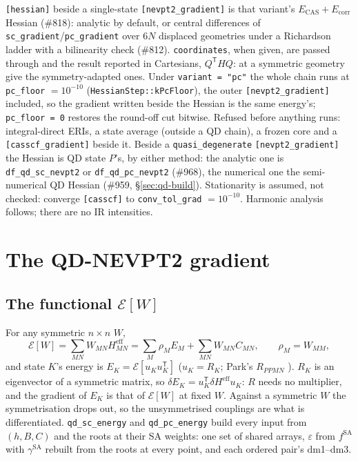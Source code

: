 \documentclass[11pt]{article}
\newcommand{\code}[1]{\texttt{#1}}
\newcommand{\eps}{\varepsilon}
\newcommand{\Ecas}{E_{\mathrm{CAS}}}
\newcommand{\Ecorr}{E_{\mathrm{corr}}}
\newcommand{\Heff}{H^{\mathrm{eff}}}
\newcommand{\T}{\mathsf T}
\begin{document}
\code{[hessian]} beside a single-state \code{[nevpt2\_gradient]} is that
variant's $\Ecas + \Ecorr$ Hessian (\#818): analytic by default, or
central differences of \code{sc\_gradient}/\code{pc\_gradient} over $6N$
displaced geometries under a Richardson ladder with a bilinearity check
(\#812). \code{coordinates}, when given, are passed through and the result
reported in Cartesians, $Q^\T HQ$: at a symmetric geometry give the
symmetry-adapted ones. Under \code{variant = "pc"} the whole chain runs at
\code{pc\_floor} $= 10^{-10}$ (\code{HessianStep::kPcFloor}), the outer
\code{[nevpt2\_gradient]} included, so the gradient written beside the
Hessian is the same energy's; \code{pc\_floor = 0} restores the round-off
cut bitwise. Refused before anything runs: integral-direct ERIs, a state
average (outside a QD chain), a frozen core and a
\code{[casscf\_gradient]} beside it. Beside a \code{quasi\_degenerate}
\code{[nevpt2\_gradient]} the Hessian is QD state $P$'s, by either
method: the analytic one is \code{df\_qd\_sc\_nevpt2} or
\code{df\_qd\_pc\_nevpt2} (\#968), the numerical one the semi-numerical QD
Hessian (\#959, \S\ref{sec:qd-build}). Stationarity is assumed, not checked:
converge \code{[casscf]} to \code{conv\_tol\_grad} $= 10^{-10}$. Harmonic
analysis follows; there are no IR intensities.

\section{The QD-NEVPT2 gradient}
\label{sec:qdgrad}

\subsection{The functional $\mathcal E[W]$}

For any symmetric $n\times n$ $W$,
\begin{equation}
  \mathcal E[W] = \sum_{MN}W_{MN}\Heff_{MN} = \sum_M\rho_M E_M + \sum_{MN}W_{MN}C_{MN},\qquad
  \rho_M = W_{MM},
  \label{eq:EW}
\end{equation}
and state $K$'s energy is $E_K = \mathcal E[u_Ku_K^\T]$ ($u_K = R_K$; Park's
$R_{PPMN}$ \cite{park2020}). $R_K$ is an eigenvector of a symmetric matrix,
so $\delta E_K = u_K^\T\delta\Heff u_K$: $R$ needs no multiplier, and the
gradient of $E_K$ is that of $\mathcal E[W]$ at fixed $W$. Against a
symmetric $W$ the symmetrisation drops out, so the unsymmetrised couplings
are what is differentiated. \code{qd\_sc\_energy} and \code{qd\_pc\_energy}
build every input from $(h, B, C)$ and the roots at their SA weights: one set
of shared arrays, $\eps$ from $f^{\mathrm{SA}}$ with $\gamma^{\mathrm{SA}}$
rebuilt from the roots at every point, and each ordered pair's dm1--dm3.
\end{document}
